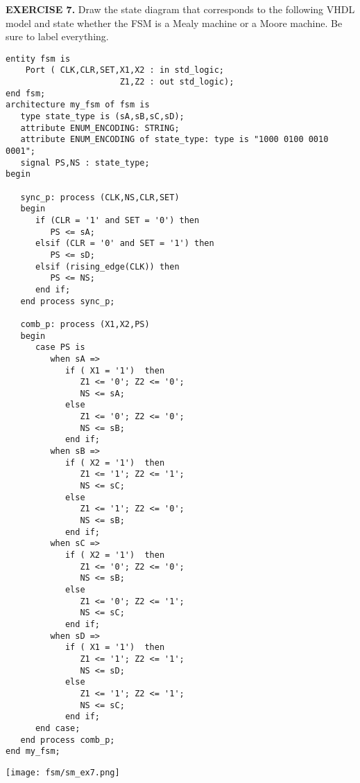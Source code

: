 \vspace{20pt}
\noindent
\begin{minipage}{1\textwidth}
\textbf{EXERCISE 7.}
Draw the state diagram that corresponds to the following VHDL model and state whether the FSM is a Mealy machine or a Moore machine. Be sure to label everything.
\vspace{10pt}
\end{minipage}
\begin{minipage}{0.66\textwidth}
\begin{lstlisting}
entity fsm is
    Port ( CLK,CLR,SET,X1,X2 : in std_logic;
                       Z1,Z2 : out std_logic);
end fsm;
architecture my_fsm of fsm is
   type state_type is (sA,sB,sC,sD); 
   attribute ENUM_ENCODING: STRING; 
   attribute ENUM_ENCODING of state_type: type is "1000 0100 0010 0001";
   signal PS,NS : state_type; 
begin

   sync_p: process (CLK,NS,CLR,SET)
   begin
      if (CLR = '1' and SET = '0') then 
         PS <= sA; 
	  elsif (CLR = '0' and SET = '1') then 
	     PS <= sD;
      elsif (rising_edge(CLK)) then   
         PS <= NS; 
      end if; 
   end process sync_p; 

   comb_p: process (X1,X2,PS)
   begin
      case PS is 
         when sA =>  
            if ( X1 = '1')  then 
               Z1 <= '0'; Z2 <= '0';   
               NS <= sA; 
            else  
               Z1 <= '0'; Z2 <= '0';   
               NS <= sB; 
            end if; 
         when sB =>
            if ( X2 = '1')  then 
               Z1 <= '1'; Z2 <= '1';   
               NS <= sC; 
            else  
               Z1 <= '1'; Z2 <= '0';   
               NS <= sB; 
            end if;				
         when sC =>
            if ( X2 = '1')  then 
               Z1 <= '0'; Z2 <= '0';   
               NS <= sB; 
            else  
               Z1 <= '0'; Z2 <= '1';   
               NS <= sC; 
            end if;
         when sD =>
            if ( X1 = '1')  then 
               Z1 <= '1'; Z2 <= '1';   
               NS <= sD; 
            else  
               Z1 <= '1'; Z2 <= '1';   
               NS <= sC; 
            end if;				
      end case; 
   end process comb_p; 
end my_fsm;
\end{lstlisting}
\end{minipage}
\begin{minipage}{0.29\textwidth}
\texttt{[image: fsm/sm\_ex7.png]}
\vspace{250px}
\end{minipage}

